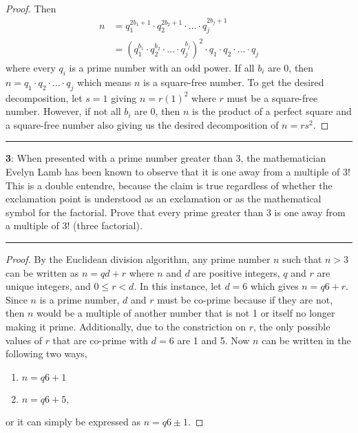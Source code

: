 \documentclass[11pt]{article}
\newcommand\question[2]{\vspace{.25in}\hrule\textbf{#1}: #2\vspace{.5em}\hrule\vspace{.10in}}
\begin{document}
\begin{proof}
	Then 
	\begin{align*}
		n&=q_1^{2b_1+1} \cdot q_2^{2b_2+1} \cdot \ldots \cdot q_j^{2b_j+1}\\
		&= (q_1^{b_1} \cdot q_2^{b_2} \cdot \ldots \cdot q_j^{b_j})^2 \cdot q_1 \cdot q_2 \cdot \ldots \cdot q_j
	\end{align*} 
	where every $q_i$ is a prime number with an odd power. If all $b_i$ are 0, then $n=q_1 \cdot q_2 \cdot \ldots \cdot q_j$ which means $n$ is a square-free number. To get the desired decomposition, let $s=1$ giving $n=r(1)^2$ where $r$ must be a square-free number. However, if not all $b_i$ are 0, then $n$ is the product of a perfect square and a square-free number also giving us the desired decomposition of $n=rs^2$.
\end{proof}

\question{3}{When presented with a prime number greater than 3, the mathematician  Evelyn Lamb has been known to observe that it is one away from a multiple of $3!$ This is a double entendre, because the claim is true regardless of whether the exclamation point is understood as an exclamation or as the mathematical symbol for the factorial. Prove that every prime greater than 3 is one away from a multiple of $3!$ (three factorial).}

\begin{proof}
	By the Euclidean division algorithm, any prime number $n$ such that $n>3$ can be written as $n=qd+r$ where $n$ and $d$ are positive integers, $q$ and $r$ are unique integers, and $0 \le r < d$. In this instance, let $d=6$ which gives $n=q6+r$. Since $n$ is a prime number, $d$ and $r$ must be co-prime because if they are not, then $n$ would be a multiple of another number that is not 1 or itself no longer making it prime. Additionally, due to the constriction on $r$, the only possible values of $r$ that are co-prime with $d=6$ are 1 and 5. Now $n$ can be written in the following two ways,
	\begin{enumerate}
		\item $n=q6+1$
		\item $n=q6+5$,
	\end{enumerate}
	or it can simply be expressed as $n=q6\pm 1$.
\end{proof}



	
\end{document}

